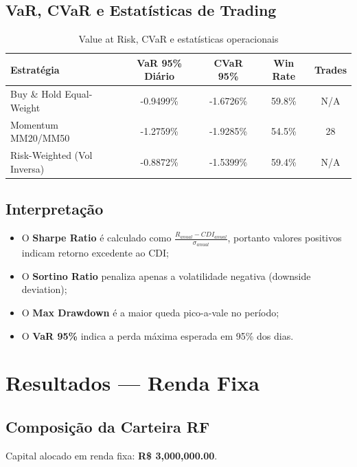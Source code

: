 \documentclass[a4paper, 12pt]{article}
\begin{document}
\subsection{VaR, CVaR e Estatísticas de Trading}

\begin{table}[H]
\centering
\caption{Value at Risk, CVaR e estatísticas operacionais}
\label{tab:var_cvar}
    \begin{tabular}{lcccc}
    \toprule
    \textbf{Estratégia} & \textbf{VaR 95\% Diário} & \textbf{CVaR 95\%} & \textbf{Win Rate} & \textbf{Trades} \\
    \midrule
        Buy \& Hold Equal-Weight & -0.9499\% & -1.6726\% & 59.8\% & N/A \\
        Momentum MM20/MM50 & -1.2759\% & -1.9285\% & 54.5\% & 28 \\
        Risk-Weighted (Vol Inversa) & -0.8872\% & -1.5399\% & 59.4\% & N/A \\
    \bottomrule
    \end{tabular}
\end{table}

\subsection{Interpretação}
\begin{itemize}
    \item O \textbf{Sharpe Ratio} é calculado como $\frac{R_{anual} - CDI_{anual}}{\sigma_{anual}}$,
          portanto valores positivos indicam retorno excedente ao CDI;
    \item O \textbf{Sortino Ratio} penaliza apenas a volatilidade negativa (downside deviation);
    \item O \textbf{Max Drawdown} é a maior queda pico-a-vale no período;
    \item O \textbf{VaR 95\%} indica a perda máxima esperada em 95\% dos dias.
\end{itemize}

\newpage
\section{Resultados — Renda Fixa}

\subsection{Composição da Carteira RF}
Capital alocado em renda fixa: \textbf{R\$ 3,000,000.00}.
\end{document}
